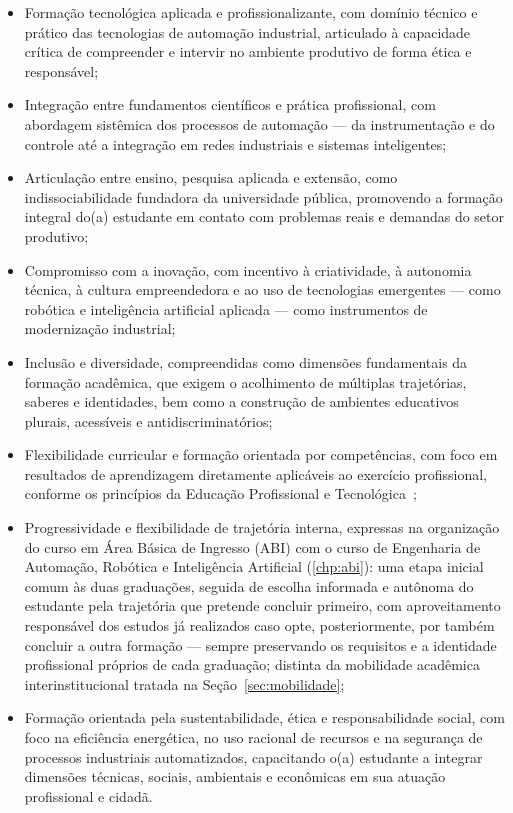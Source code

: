 \begin{itemize}
    \item Formação tecnológica aplicada e profissionalizante, com domínio técnico e prático das tecnologias de automação industrial, articulado à capacidade crítica de compreender e intervir no ambiente produtivo de forma ética e responsável;
    \item Integração entre fundamentos científicos e prática profissional, com abordagem sistêmica dos processos de automação — da instrumentação e do controle até a integração em redes industriais e sistemas inteligentes;
    \item Articulação entre ensino, pesquisa aplicada e extensão, como indissociabilidade fundadora da universidade pública, promovendo a formação integral do(a) estudante em contato com problemas reais e demandas do setor produtivo;
    \item Compromisso com a inovação, com incentivo à criatividade, à autonomia técnica, à cultura empreendedora e ao uso de tecnologias emergentes — como robótica e inteligência artificial aplicada — como instrumentos de modernização industrial;
    \item Inclusão e diversidade, compreendidas como dimensões fundamentais da formação acadêmica, que exigem o acolhimento de múltiplas trajetórias, saberes e identidades, bem como a construção de ambientes educativos plurais, acessíveis e antidiscriminatórios;
    \item Flexibilidade curricular e formação orientada por competências, com foco em resultados de aprendizagem diretamente aplicáveis ao exercício profissional, conforme os princípios da Educação Profissional e Tecnológica~\cite{cne_cp_1_2021};
    \item Progressividade e flexibilidade de trajetória interna, expressas na organização do curso em Área Básica de Ingresso (ABI) com o curso de Engenharia de Automação, Robótica e Inteligência Artificial (\autoref{chp:abi}): uma etapa inicial comum às duas graduações, seguida de escolha informada e autônoma do estudante pela trajetória que pretende concluir primeiro, com aproveitamento responsável dos estudos já realizados caso opte, posteriormente, por também concluir a outra formação — sempre preservando os requisitos e a identidade profissional próprios de cada graduação; distinta da mobilidade acadêmica interinstitucional tratada na Seção~\ref{sec:mobilidade};
    \item Formação orientada pela sustentabilidade, ética e responsabilidade social, com foco na eficiência energética, no uso racional de recursos e na segurança de processos industriais automatizados, capacitando o(a) estudante a integrar dimensões técnicas, sociais, ambientais e econômicas em sua atuação profissional e cidadã.
\end{itemize}

